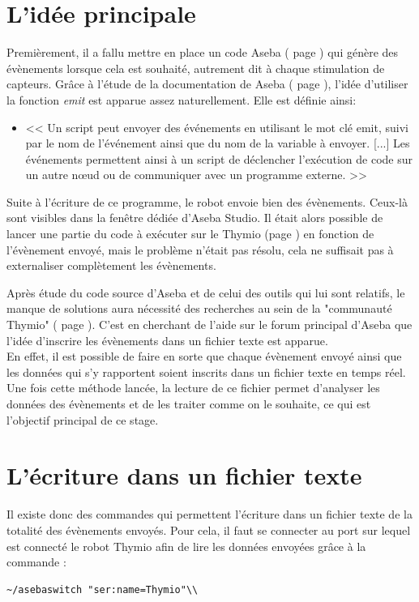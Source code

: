 \documentclass[a4paper, 12pt]{report}
\begin{document}
\section{L'idée principale}
Premièrement, il a fallu mettre en place un code Aseba ( page \pageref{aseba} ) qui génère des évènements lorsque cela est souhaité, autrement dit à chaque stimulation de capteurs. Grâce à l'étude de la documentation de Aseba ( page \pageref{aseba} ), l'idée d'utiliser la fonction \textit{emit} est apparue assez naturellement. Elle est définie ainsi:

\begin{itemize}
\item{<< Un script peut envoyer des événements en utilisant le mot clé emit, suivi par le nom de l'événement ainsi que du nom de la variable à envoyer. [...] Les événements permettent ainsi à un script de déclencher l'exécution de code sur un autre nœud ou de communiquer avec un programme externe. >>}
\end{itemize}

Suite à l'écriture de ce programme, le robot envoie bien des évènements. Ceux-là sont visibles dans la fenêtre dédiée d'Aseba Studio. Il était alors possible de lancer une partie du code à exécuter sur le Thymio (page \pageref{thymio} ) en fonction de l'évènement envoyé, mais le problème n'était pas résolu, cela ne suffisait pas à externaliser complètement les évènements.

Après étude du code source d'Aseba \cite{CodeASEBA} et de celui des outils qui lui sont relatifs, le manque de solutions aura nécessité des recherches au sein de la "communauté Thymio" ( page \pageref{PhiloThymio} ). C'est en cherchant de l'aide sur le forum principal d'Aseba que l'idée d'inscrire les évènements dans un fichier texte est apparue.\cite{ForumThymio}\\
En effet, il est possible de faire en sorte que chaque évènement envoyé ainsi que les données qui s'y rapportent soient inscrits dans un fichier texte en temps réel. Une fois cette méthode lancée, la lecture de ce fichier permet d'analyser les données des évènements et de les traiter comme on le souhaite, ce qui est l'objectif principal de ce stage.

\section{L'écriture dans un fichier texte}
Il existe donc des commandes qui permettent l'écriture dans un fichier texte de la totalité des évènements envoyés. Pour cela, il faut se connecter au port sur lequel est connecté le robot Thymio afin de lire les données envoyées grâce à la commande :
\begin{verbatim}
~/asebaswitch "ser:name=Thymio"\\
\end{verbatim}
 
\end{document}
